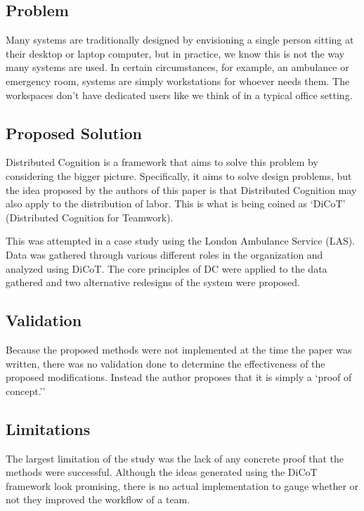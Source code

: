 \subsection{Problem}
Many systems are traditionally designed by envisioning a single person sitting at their desktop or laptop computer, but in practice, we know this is not the way many systems are used. In certain circumstances, for example, an ambulance or emergency room, systems are simply workstations for whoever needs them. The workspaces don't have dedicated users like we think of in a typical office setting.

\subsection{Proposed Solution}
Distributed Cognition is a framework that aims to solve this problem by considering the bigger picture. Specifically, it aims to solve design problems, but the idea proposed by the authors of this paper is that Distributed Cognition may also apply to the distribution of labor. This is what is being coined as `DiCoT' (Distributed Cognition for Teamwork).

This was attempted in a case study using the London Ambulance Service (LAS). Data was gathered through various different roles in the organization and analyzed using DiCoT. The core principles of DC were applied to the data gathered and two alternative redesigns of the system were proposed.

\subsection{Validation}
Because the proposed methods were not implemented at the time the paper was written, there was no validation done to determine the effectiveness of the proposed modifications. Instead the author proposes that it is simply a `proof of concept.''

\subsection{Limitations}
The largest limitation of the study was the lack of any concrete proof that the methods were successful. Although the ideas generated using the DiCoT framework look promising, there is no actual implementation to gauge whether or not they improved the workflow of a team.
